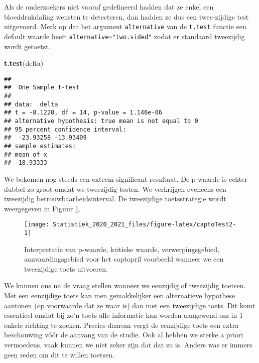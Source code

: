 \documentclass[
  12pt,dutch,coursenotes]{book}
\newenvironment{Shaded}{\begin{snugshade}}{\end{snugshade}}
\newcommand{\KeywordTok}[1]{\textcolor[rgb]{0.13,0.29,0.53}{\textbf{#1}}}
\newcommand{\NormalTok}[1]{#1}
\theoremstyle{definition}
\theoremstyle{definition}
\theoremstyle{definition}
\theoremstyle{remark}
\begin{document}
Als de onderzoekers niet vooraf gedefineerd hadden dat ze enkel een bloeddrukdaling wensten te detecteren, dan hadden ze dus een twee-zijdige test uitgevoerd.
Merk op dat het argument \texttt{alternative} van de \texttt{t.test} functie een default waarde heeft \texttt{alternative="two.sided"} zodat er standaard tweezijdig wordt getoetst.

\begin{Shaded}
\begin{Highlighting}[]
\KeywordTok{t.test}\NormalTok{(delta)}
\end{Highlighting}
\end{Shaded}

\begin{verbatim}
## 
## 	One Sample t-test
## 
## data:  delta
## t = -8.1228, df = 14, p-value = 1.146e-06
## alternative hypothesis: true mean is not equal to 0
## 95 percent confidence interval:
##  -23.93258 -13.93409
## sample estimates:
## mean of x 
## -18.93333
\end{verbatim}

We bekomen nog steeds een exteem significant resultaat. De p-waarde is echter dubbel zo groot omdat we tweezijdig testen.
We verkrijgen eveneens een tweezijdig betrouwbaarheidsinterval.
De tweezijdige toetsstrategie wordt weergegeven in Figuur \ref{fig:captoTest2}.

\begin{figure}

{\centering \texttt{[image: Statistiek\_2020\_2021\_files/figure-latex/captoTest2-1]} 

}

\caption{Interpretatie van p-waarde, kritieke waarde, verwerpingsgebied, aanvaardingsgebied voor het captopril voorbeeld wanneer we een tweezijdige toets uitvoeren.}\label{fig:captoTest2}
\end{figure}

We kunnen ons nu de vraag stellen wanneer we eenzijdig of tweezijdig toetsen.
Met een eenzijdige toets kan men gemakkelijker een alternatieve hypothese
aantonen (op voorwaarde dat ze waar is) dan met een tweezijdige toets. Dit
komt essentieel omdat bij zo'n toets alle informatie kan worden aangewend om
in 1 enkele richting te zoeken. Precies daarom vergt de eenzijdige toets een
extra beschouwing vóór de aanvang van de studie. Ook al hebben we sterke
a priori vermoedens, vaak kunnen we niet zeker zijn dat dat zo is.
Anders was er immers geen reden om
dit te willen toetsen.
\end{document}
